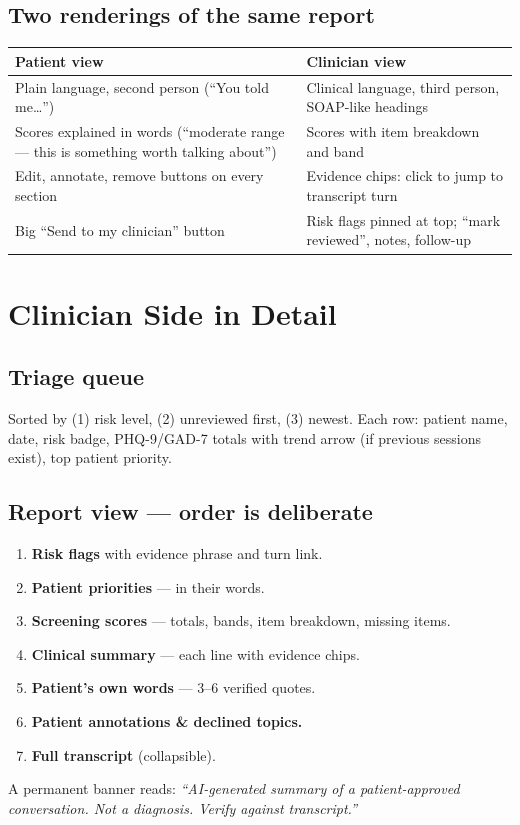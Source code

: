 \documentclass[11pt]{article}
\begin{document}
\subsection{Two renderings of the same report}
\begin{tabularx}{\textwidth}{@{}X X@{}}
\toprule
\textcolor{patient}{\textbf{Patient view}} & \textcolor{clinic}{\textbf{Clinician view}} \\
\midrule
Plain language, second person (``You told me\ldots'') & Clinical language, third person, SOAP-like headings \\
Scores explained in words (``moderate range --- this is something worth talking about'') & Scores with item breakdown and band \\
Edit, annotate, remove buttons on every section & Evidence chips: click to jump to transcript turn \\
Big ``Send to my clinician'' button & Risk flags pinned at top; ``mark reviewed'', notes, follow-up \\
\bottomrule
\end{tabularx}

\section{Clinician Side in Detail}

\subsection{Triage queue}
Sorted by (1) risk level, (2) unreviewed first, (3) newest. Each row: patient name, date, risk badge, PHQ-9/GAD-7 totals with trend arrow
(if previous sessions exist), top patient priority.

\subsection{Report view --- order is deliberate}
\begin{enumerate}
  \item \textcolor{danger}{\textbf{Risk flags}} with evidence phrase and turn link.
  \item \textbf{Patient priorities} --- in their words.
  \item \textbf{Screening scores} --- totals, bands, item breakdown, missing items.
  \item \textbf{Clinical summary} --- each line with evidence chips.
  \item \textbf{Patient's own words} --- 3--6 verified quotes.
  \item \textbf{Patient annotations \& declined topics.}
  \item \textbf{Full transcript} (collapsible).
\end{enumerate}
A permanent banner reads: \emph{``AI-generated summary of a patient-approved conversation. Not a diagnosis. Verify against transcript.''}
\end{document}
